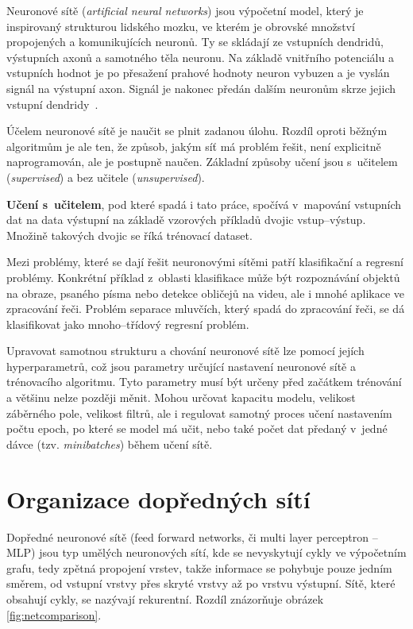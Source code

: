 Neuronové sítě (\textit{artificial neural networks}) jsou výpočetní model, který je inspirovaný strukturou lidského mozku, ve kterém je obrovské množství propojených a komunikujících neuronů. Ty se skládají ze vstupních dendridů, výstupních axonů a samotného těla neuronu. Na základě vnitřního potenciálu a vstupních hodnot je po přesažení prahové hodnoty neuron vybuzen a je vyslán signál na výstupní axon. Signál je nakonec předán dalším neuronům skrze jejich vstupní dendridy~\cite{mitdeeplearning_small}.

Účelem neuronové sítě je naučit se plnit zadanou úlohu. Rozdíl oproti běžným algoritmům je ale ten, že způsob, jakým síť má problém řešit, není explicitně naprogramován, ale je postupně naučen. Základní způsoby učení jsou s~učitelem (\textit{supervised}) a bez učitele (\textit{unsupervised}). 

\textbf{Učení s~učitelem}, pod které spadá i tato práce, spočívá v~mapování vstupních dat na data výstupní na základě vzorových příkladů dvojic vstup--výstup. Množině takových dvojic se říká trénovací dataset.

Mezi problémy, které se dají řešit neuronovými sítěmi patří klasifikační a regresní problémy. Konkrétní příklad z~oblasti klasifikace může být rozpoznávání objektů na obraze, psaného písma nebo detekce obličejů na videu, ale i mnohé aplikace ve zpracování řeči. Problém separace mluvčích, který spadá do zpracování řeči, se dá klasifikovat jako mnoho--třídový regresní problém.

Upravovat samotnou strukturu a chování neuronové sítě lze pomocí jejích hyperparametrů, což jsou parametry určující nastavení neuronové sítě a trénovacího algoritmu. Tyto parametry musí být určeny před začátkem trénování a většinu nelze později měnit. Mohou určovat kapacitu modelu, velikost záběrného pole, velikost filtrů, ale i regulovat samotný proces učení nastavením počtu epoch, po které se model má učit, nebo také počet dat předaný v~jedné dávce (tzv. \textit{minibatches}) během učení sítě.


\section{Organizace dopředných sítí}
Dopředné neuronové sítě (feed forward networks, či multi layer perceptron -- MLP) jsou typ umělých neuronových sítí, kde se nevyskytují cykly ve výpočetním grafu, tedy zpětná propojení vrstev, takže informace se pohybuje pouze jedním směrem, od vstupní vrstvy přes skryté vrstvy až po vrstvu výstupní. Sítě, které obsahují cykly, se nazývají rekurentní. Rozdíl znázorňuje obrázek \ref{fig:netcomparison}.

